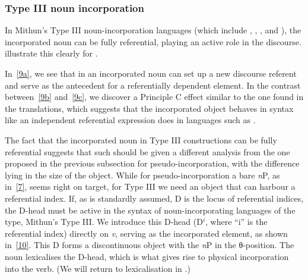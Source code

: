\documentclass[output=paper]{langsci/langscibook}
\begin{document}
\begin{refcontext}
\subsubsection{Type III noun incorporation}
In Mithun’s Type III noun-incorporation languages (which include ,
, , and ), the incorporated noun can be fully referential,
playing an active role in the discourse.  \citet[145--6]{bakeretal05}
illustrate this clearly for .

\ea \label{9}
    \newpage
    \z
\z
In~\eqref{9a}, we see that in  an incorporated noun can set up a new
discourse referent and serve as the antecedent for a referentially dependent
element. In the contrast between~\eqref{9b} and~\eqref{9c}, we discover a Principle
C effect similar to the one found in the  translations, which suggests
that the incorporated object behaves in syntax like an independent referential
expression does in languages such as .

The fact that the incorporated noun in Type III constructions can be fully
referential suggests that such  should be given a different
analysis from the one proposed in the previous subsection for
pseudo-incorporation, with the difference lying in the size of the object.
While for pseudo-incorporation a bare \emph{n}P, as in~\eqref{7}, seems right on
target, for Type III  we need an object that can harbour a
referential index. If, as is standardly assumed, D is the locus of referential
indices, the D-head must be active in the syntax of noun-incorporating
languages of the  type, Mithun’s Type III. We introduce this D-head
(D$^i$, where \enquote{i} is the referential index) directly on \emph{v}, serving as
the incorporated element, as shown in~\eqref{10}. This D forms a discontinuous
object with the \emph{n}P in the θ{}-position. The noun lexicalises
the  D-head, which is what gives rise to physical incorporation into the verb.
(We will return to lexicalisation in .)


\end{refcontext}
\end{document}
